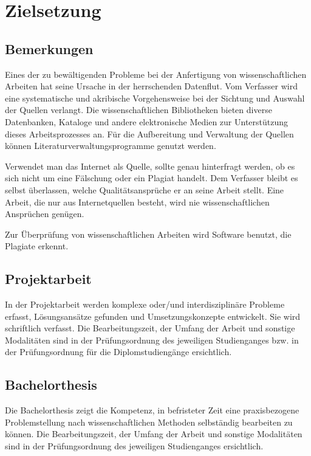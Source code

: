 \chapter{Zielsetzung}
\label{zielsetzung}
\section{Bemerkungen}
\label{zielsetzung-bemerkungen}
Eines der zu bewältigenden Probleme bei der Anfertigung von wissenschaftlichen Arbeiten hat seine Ursache in der herrschenden Datenflut.
Vom Verfasser wird eine systematische und akribische Vorgehensweise bei der Sichtung und Auswahl der Quellen verlangt.
Die wissenschaftlichen Bibliotheken bieten diverse Datenbanken, Kataloge
und andere elektronische Medien zur Unterstützung dieses Arbeitsprozesses an.
Für die Aufbereitung und Verwaltung der Quellen können Literaturverwaltungsprogramme genutzt werden.

Verwendet man das Internet als Quelle, sollte genau hinterfragt werden, ob es sich nicht um eine Fälschung oder ein Plagiat handelt.
Dem Verfasser bleibt es selbst überlassen, welche Qualitätsansprüche er an seine Arbeit stellt.
Eine Arbeit, die nur aus Internetquellen besteht, wird nie wissenschaftlichen Ansprüchen genügen. %

Zur Überprüfung von wissenschaftlichen Arbeiten wird Software benutzt, die Plagiate erkennt.


\section{Projektarbeit}
\label{zielsetzung-projektarbeit}
In der Projektarbeit werden komplexe oder/und interdisziplinäre Probleme erfasst, Lösungsansätze gefunden und Umsetzungskonzepte entwickelt.
Sie wird schriftlich verfasst.
Die Bearbeitungszeit, der Umfang der Arbeit und sonstige Modalitäten sind in der Prüfungsordnung des jeweiligen Studienganges bzw. in der Prüfungsordnung für die Diplomstudiengänge ersichtlich.

\section{Bachelorthesis}
\label{zielsetzung-bachelorthesis}
Die Bachelorthesis zeigt die Kompetenz, in befristeter Zeit eine praxisbezogene Problemstellung nach wissenschaftlichen Methoden selbständig bearbeiten zu können.
Die Bearbeitungszeit, der Umfang der Arbeit und sonstige Modalitäten sind in der Prüfungsordnung des jeweiligen Studienganges ersichtlich.

